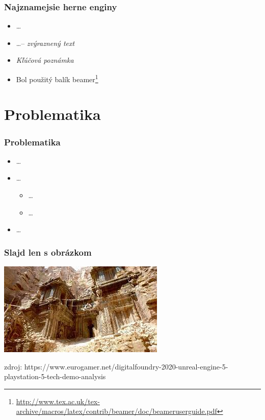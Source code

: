 \documentclass{beamer}
\newcommand{\footcite}[1]{\footnote{\tiny #1}}
\newcommand{\emp}[1]{\textit{\alert{#1}}}
\begin{document}
\begin{frame}[fragile=singleslide]\frametitle{Najznamejsie herne enginy}
\begin{itemize}
\item \ldots{}
\item \ldots{}-- \emph{zvýraznený text}
\item \emp{Kľúčová poznámka} %

\item Bol použitý balík beamer\footcite{\url{http://www.tex.ac.uk/tex-archive/macros/latex/contrib/beamer/doc/beameruserguide.pdf}}
\end{itemize}
\end{frame}



\section{Problematika}

\begin{frame}[fragile=singleslide]\frametitle{Problematika}
\begin{itemize}
\item \ldots{}
\item \ldots{}
	\begin{itemize}
	\item \ldots{}
	\item \ldots{}
	\end{itemize} 
\item \ldots{}
\end{itemize}
\end{frame}





\begin{frame}[fragile=singleslide]\frametitle{Slajd len s obrázkom}
\includegraphics[scale=.5]{URE5.jpg}

{\tiny zdroj: https://www.eurogamer.net/digitalfoundry-2020-unreal-engine-5-playstation-5-tech-demo-analysis}
\end{frame}
\end{document}

